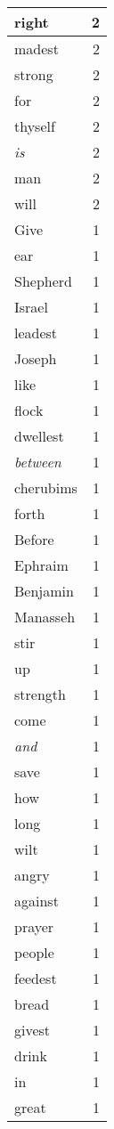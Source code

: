 \begin{center}
\begin{longtable}{l|r}
right & 2 \\ \hline
madest & 2 \\ \hline
strong & 2 \\ \hline
for & 2 \\ \hline
thyself & 2 \\ \hline
\emph{is} & 2 \\ \hline
man & 2 \\ \hline
will & 2 \\ \hline
Give & 1 \\ \hline
ear & 1 \\ \hline
Shepherd & 1 \\ \hline
Israel & 1 \\ \hline
leadest & 1 \\ \hline
Joseph & 1 \\ \hline
like & 1 \\ \hline
flock & 1 \\ \hline
dwellest & 1 \\ \hline
\emph{between} & 1 \\ \hline
cherubims & 1 \\ \hline
forth & 1 \\ \hline
Before & 1 \\ \hline
Ephraim & 1 \\ \hline
Benjamin & 1 \\ \hline
Manasseh & 1 \\ \hline
stir & 1 \\ \hline
up & 1 \\ \hline
strength & 1 \\ \hline
come & 1 \\ \hline
\emph{and} & 1 \\ \hline
save & 1 \\ \hline
how & 1 \\ \hline
long & 1 \\ \hline
wilt & 1 \\ \hline
angry & 1 \\ \hline
against & 1 \\ \hline
prayer & 1 \\ \hline
people & 1 \\ \hline
feedest & 1 \\ \hline
bread & 1 \\ \hline
givest & 1 \\ \hline
drink & 1 \\ \hline
in & 1 \\ \hline
great & 1 \\ \hline

\end{longtable}
\end{center}

